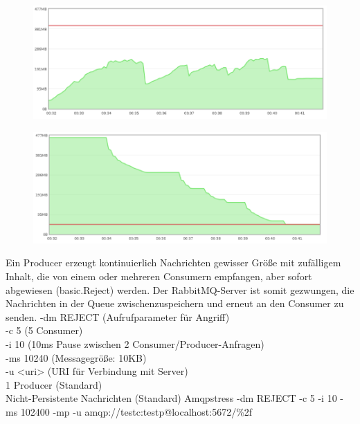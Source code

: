 \documentclass[	a4paper,
			11pt,
			titlepage,
			oneside,
			fleqn,
			listof=totoc,
			parskip,
			numbers=noenddot]{scrartcl}
\begin{document}
		\begin{figure}[!htb]
			\centering
			\includegraphics[width=\textwidth]{img/noResp/ram.png}
		\end{figure}
		
		\begin{figure}[!htb]
			\centering
			\includegraphics[width=\textwidth]{img/noResp/disk.png}
		\end{figure}
	
\clearpage	
		{Ein Producer erzeugt kontinuierlich Nachrichten gewisser Größe mit zufälligem Inhalt, die von einem oder mehreren Consumern empfangen, aber sofort abgewiesen (basic.Reject) werden.%
		 Der RabbitMQ-Server ist somit gezwungen, die Nachrichten in der Queue zwischenzuspeichern und erneut an den Consumer zu senden.}%
		{%
		 -dm REJECT (Aufrufparameter für Angriff) \\
		 -c 5 (5 Consumer) \\
		 -i 10 (10ms Pause zwischen 2 Consumer/Producer-Anfragen) \\
		 -ms 10240 (Messagegröße: 10KB) \\
		 -u <uri> (URI für Verbindung mit Server) \\
		 1 Producer (Standard) \\
		 Nicht-Persistente Nachrichten (Standard)
		}%
		{Amqpstress -dm REJECT -c 5 -i 10 -ms 102400 -mp -u amqp://testc:testp@localhost:5672/\%2f}%
		{%
		 \\
		 \\
		 \\
		}%
		{}
	
\end{document}
